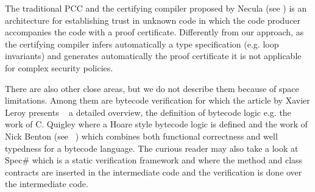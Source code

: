 
 The traditional PCC and the certifying compiler proposed by Necula (see \cite{ComNec,DesNecLee98}) is an architecture for 
 establishing trust in unknown code in which the code producer accompanies the code with a proof certificate. Differently from our approach,
  as the certifying compiler infers automatically a type specification (e.g. loop invariants) and generates automatically the proof certificate
  it is not applicable for complex security policies.

There are also other close areas, but we do not describe them because of space limitations.
Among them are bytecode verification for which the article by Xavier Leroy presents ~\cite{Ljbc} a detailed overview, 
the definition of bytecode logic e.g. the work of C. Quigley \cite{Quigley} where a Hoare style bytecode logic is defined and
the work of Nick Benton (see ~\cite{B04tlsj}) which combines both functional correctness and well typedness for a bytecode language. 
The curious reader may also take a look at Spec\# \cite{BLS04sp} which is a static verification framework and
 where the method and class contracts are inserted in the intermediate code and the verification is done over the intermediate code. 



 

